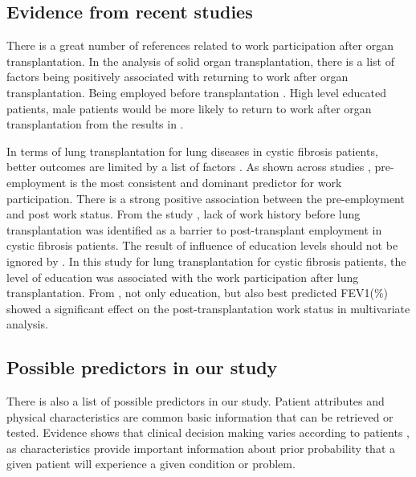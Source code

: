 \documentclass[11pt, a4paper]{article}\usepackage[]{graphicx}\usepackage[]{color}
\begin{document}
\subsection*{Evidence from recent studies} 

There is a great number of references related to work participation after organ transplantation. In the analysis of solid organ transplantation, there is a list of factors being positively associated with returning to work after organ transplantation. Being employed before transplantation \citep{hunt1996effect, nour2015factors, white2011factors}. High level educated patients, male patients would be more likely to return to work after organ transplantation from the results in \cite{vieux2018predictors}.

In terms of lung transplantation for lung diseases in cystic fibrosis patients, better outcomes are limited by a list of factors \citep{targett2013employment, taylor2013longitudinal, laborde2012employment}. As shown across studies \cite{huda2015employment, eppenberger2015back, aaberg2016prolonging, matas1996employment}, pre-employment is the most consistent and dominant predictor for work participation. There is a strong positive association between the pre-employment and post work status. From the study \cite{krivchenia2016long}, lack of work history before lung transplantation was identified as a barrier to post-transplant employment in cystic fibrosis patients. 
The result of influence of education levels should not be ignored by \cite{krivchenia2016long}. In this study for lung transplantation for cystic fibrosis patients, the level of education was associated with the work participation  after lung transplantation. From \cite{laborde2012employment}, not only education, but also best predicted FEV1(\%) showed a significant effect on the post-transplantation work status in multivariate analysis.

\subsection*{Possible predictors in our study} 

There is also a list of possible predictors in our study. Patient attributes and physical characteristics are common basic information that can be retrieved or tested. Evidence shows that clinical decision making varies according to patients \citep{lutfey2008patient}, as characteristics provide important information about prior probability that a given patient will experience a given condition or problem. 
\end{document}
